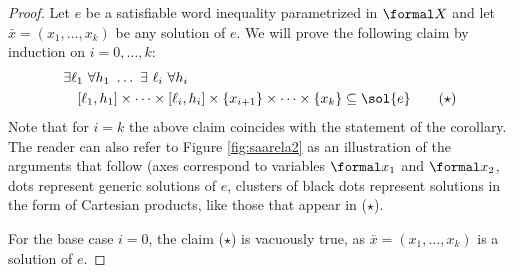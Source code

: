 \documentclass{article}
\begin{document}
\begin{proof}
Let $e$ be a satisfiable word inequality parametrized in $\formal X$ and
let $\bar x = (x_1,\dots,x_k)$ be any solution of $e$.
We will prove the following claim by induction on $i=0,\dots,k$:
\begin{align*}
 & \exists \ell_1 ~ \forall h_1 ~ \dots ~ \exists ~ \ell_i ~ \forall h_i\\
 & \quad
 [\ell_1,h_1]\times\cdots\times[\ell_i,h_i]\times\{x_{i+1}\}\times\dots\times\{x_k\} \subseteq \sol{e}
 \tag{$\star$}
\end{align*}
Note that for $i=k$ the above claim coincides with the statement of the corollary.
The reader can also refer to Figure \ref{fig:saarela2} as an illustration 
of the arguments that follow (axes correspond to variables $\formal x_1$ 
and $\formal x_2$, dots represent generic solutions of $e$, 
clusters of black dots represent solutions in the form of Cartesian products,
like those that appear in ($\star$).

For the base case $i=0$, the claim ($\star$) is vacuously true, as $\bar x=(x_1,\dots,x_k)$
is a solution of $e$.


\end{proof}
\end{document}
